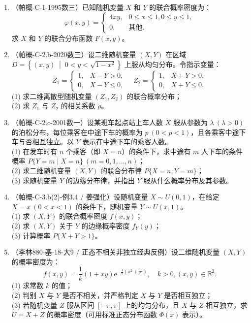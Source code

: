 \documentclass[12pt,a4paper]{ctexart}
\begin{document}
\begin{enumerate}[label=\arabic*.,resume]

\item（帕概-C-1-1995数三）已知随机变量 $X$ 和 $Y$ 的联合概率密度为：
\[
\varphi(x, y) = \begin{cases} 4xy, & 0 \leqslant x \leqslant 1, 0 \leqslant y \leqslant 1, \\ 0, & \text{其他}. \end{cases}
\]
求 $X$ 和 $Y$ 的联合分布函数 $F(x, y)$。

\item（帕概-C-2.b-2020数三）设二维随机变量 $(X, Y)$ 在区域 $D = \left\{(x, y) \;\middle|\; 0 < y < \sqrt{1 - x^{2}}\right\}$ 上服从均匀分布。令指示变量：
\[
Z_{1} = \begin{cases} 1, & X - Y > 0, \\ 0, & X - Y \leqslant 0, \end{cases} \quad Z_{2} = \begin{cases} 1, & X + Y > 0, \\ 0, & X + Y \leqslant 0. \end{cases}
\]
(1) 求二维离散型随机变量 $(Z_{1}, Z_{2})$ 的联合概率分布；\\
(2) 求 $Z_{1}$ 与 $Z_{2}$ 的相关系数 $\rho$。

\item（帕概-C-2.c-2001数一）设某班车起点站上车人数 $X$ 服从参数为 $\lambda\ (\lambda > 0)$ 的泊松分布，每位乘客在中途下车的概率为 $p\ (0 < p < 1)$，且各乘客中途下车与否相互独立。以 $Y$ 表示在中途下车的乘客人数。\\
(1) 在发车时有 $n$ 个乘客（即 $X = n$）的条件下，求中途有 $m$ 人下车的条件概率 $P\{Y = m \mid X = n\}\ (m = 0, 1, \dots, n)$；\\
(2) 求二维随机变量 $(X, Y)$ 的联合分布律 $P\{X = n, Y = m\}$；\\
(3) 求随机变量 $Y$ 的边缘分布律，并指出 $Y$ 服从什么概率分布及其参数。

\item（帕概-C-3.b(2)-例3.4 / 姜强化）设随机变量 $X \sim U(0, 1)$，在给定 $X = x\ (0 < x < 1)$ 的条件下，随机变量 $Y \sim U(x, 1)$。\\
(1) 求 $(X, Y)$ 的联合概率密度 $f(x, y)$；\\
(2) 求 $(X, Y)$ 关于 $Y$ 的边缘概率密度 $f_{Y}(y)$；\\
(3) 计算概率 $P\{X + Y > 1\}$。

\item（李林880-基-18-大9 / 正态不相关非独立经典反例）设二维随机变量 $(X, Y)$ 的概率密度为：
\[
f(x, y) = \frac{1}{k} (1 + xy)\mathrm{e}^{-\frac{1}{2}(x^{2} + y^{2})}, \quad k > 0, (x, y) \in \mathbb{R}^{2}.
\]
(1) 求常数 $k$ 的值；\\
(2) 判别 $X$ 与 $Y$ 是否不相关，并严格判定 $X$ 与 $Y$ 是否相互独立；\\
(3) 若随机变量 $Z$ 服从区间 $[-\pi, \pi]$ 上的均匀分布，且 $X$ 与 $Z$ 相互独立，求 $U = X + Z$ 的概率密度（可用标准正态分布函数 $\Phi(x)$ 表示）。


\end{enumerate}
\end{document}
